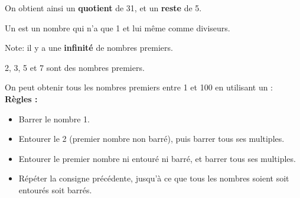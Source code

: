 \documentclass[../€Cours-complet/Cours-complet]{subfiles}
\begin{document}
\begin{exemple}
	On obtient ainsi un \textbf{quotient} de 31, et un \textbf{reste} de 5.
\end{exemple}

\begin{cours}
	Un  est un nombre qui n'a que 1 et lui même comme diviseurs.
\end{cours}

Note: il y a une \textbf{infinité} de nombres premiers.

\begin{exemple}
	2, 3, 5 et 7 sont des nombres premiers.
\end{exemple}

\newpage

On peut obtenir tous les nombres premiers entre 1 et 100 en utilisant un  : \\

\textbf{Règles :}
\begin{itemize} \setlength\itemsep{0.3em}
	\item Barrer le nombre 1.
	\item Entourer le 2 (premier nombre non barré), puis barrer tous ses multiples.
	\item Entourer le premier nombre ni entouré ni barré, et barrer tous ses multiples.
	\item Répéter la consigne précédente, jusqu'à ce que tous les nombres soient soit entourés soit barrés.
\end{itemize}
\vspace{0.7cm}
\end{document}
